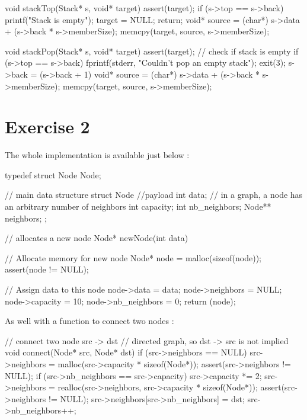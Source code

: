 \documentclass[a4paper,11pt]{report}
\begin{document}
\begin{ccode}
void stackTop(Stack* s, void* target)
{
    assert(target);
    if (s->top == s->back)
    {
        printf("Stack is empty\n");
        target = NULL;
        return;
    }
    void* source = (char*) s->data + (s->back * s->memberSize);
    memcpy(target, source, s->memberSize);
}
\end{ccode}

\begin{ccode}
void stackPop(Stack* s, void* target)
{
    assert(target);
    // check if stack is empty
    if (s->top == s->back)
    {
        fprintf(stderr, "Couldn't pop an empty stack\n");
        exit(3);
    }
    s->back = (s->back + 1) %
    void* source = (char*) s->data + (s->back * s->memberSize);
    memcpy(target, source, s->memberSize);
}
\end{ccode}

\section*{Exercise 2}

The whole implementation is available just below :

\begin{ccode}
typedef struct Node Node;

// main data structure
struct Node
{
    //payload
    int data;
    // in a graph, a node has an arbitrary number of neighbors
    int capacity;
    int nb_neighbors;
    Node** neighbors;
};

// allocates a new node 
Node* newNode(int data)
{
    // Allocate memory for new node
    Node* node = malloc(sizeof(node));
    assert(node != NULL);

    // Assign data to this node
    node->data = data;
    node->neighbors = NULL;
    node->capacity = 10;
    node->nb_neighbors = 0;
    return (node);
}
\end{ccode}

As well with a function to connect two nodes :

\begin{ccode}
// connect two node src -> dst
// directed graph, so dst -> src is not implied
void connect(Node* src, Node* dst)
{
    if (src->neighbors == NULL)
    {
        src->neighbors = malloc(src->capacity * sizeof(Node*));
        assert(src->neighbors != NULL);
    }
    if (src->nb_neighbors == src->capacity)
    {
        src->capacity *= 2;
        src->neighbors = realloc(src->neighbors, src->capacity * sizeof(Node*));
        assert(src->neighbors != NULL);
    }
    src->neighbors[src->nb_neighbors] = dst;
    src->nb_neighbors++;
}
\end{ccode}
\end{document}
